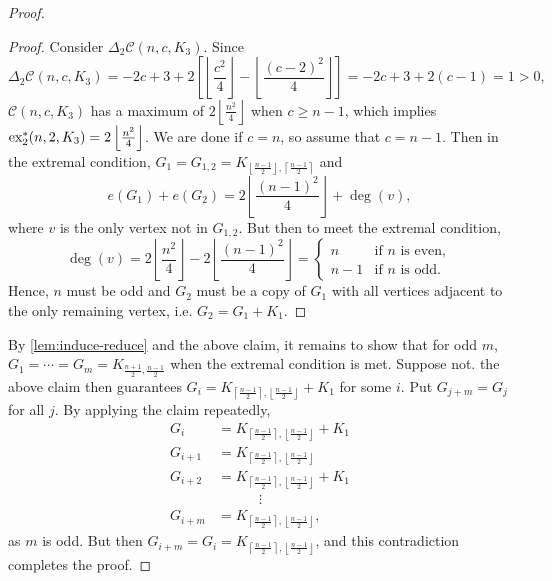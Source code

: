 \documentclass[12pt]{report}
\newcommand*{\dex}{\textnormal{ex}_2}
\newcommand*{\con}{\mathcal{C}}
\begin{document}
\begin{proof}
  \begin{proof}
    Consider $\Delta_2 \con(n, c, K_3)$. Since
    \[
      \Delta_2 \con(n, c, K_3) = -2c + 3 + 2\left[\left\lfloor\frac{c^2}{4}\right\rfloor - \left\lfloor\frac{(c - 2)^2}{4}\right\rfloor\right] = -2c + 3 + 2(c - 1) = 1 > 0,
    \]
    $\con(n, c, K_3)$ has a maximum of $2\left\lfloor \frac{n^2}{4} \right\rfloor$ when $c \geq n - 1$, which implies $\dex^*(n, 2, K_3) = 2\left\lfloor\frac{n^2}{4}\right\rfloor$. We are done if $c = n$, so assume that $c = n - 1$. Then in the extremal condition, $G_1 = G_{1, 2} = K_{\left\lfloor\frac{n - 1}{2}\right\rfloor, \left\lceil\frac{n - 1}{2}\right\rceil}$ and
    \[
      e(G_1) + e(G_2) = 2\left\lfloor\frac{(n - 1)^2}{4}\right\rfloor + \deg(v),
    \]
    where $v$ is the only vertex not in $G_{1, 2}$. But then to meet the extremal condition, 
    \[
      \deg(v) = 2\left\lfloor\frac{n^2}{4}\right\rfloor - 2\left\lfloor\frac{(n - 1)^2}{4}\right\rfloor = \begin{cases}
        n & \text{if $n$ is even}, \\
        n - 1 & \text{if $n$ is odd}.
      \end{cases}
    \]
    Hence, $n$ must be odd and $G_2$ must be a copy of $G_1$ with all vertices adjacent to the only remaining vertex, i.e. $G_2 = G_1 + K_1$.
  \end{proof}
  By \cref{lem:induce-reduce} and the above claim, it remains to show that for odd $m$, $G_1 = \cdots = G_m = K_{\frac{n + 1}{2}, \frac{n - 1}{2}}$ when the extremal condition is met. Suppose not. the above claim then guarantees $G_i = K_{\left\lceil\frac{n - 1}{2}\right\rceil, \left\lfloor\frac{n - 1}{2}\right\rfloor} + K_1$ for some $i$. Put $G_{j + m} = G_j$ for all $j$. By applying the claim repeatedly, 
  \begin{align*}
    G_i &= K_{\left\lceil\frac{n - 1}{2}\right\rceil, \left\lfloor\frac{n - 1}{2}\right\rfloor} + K_1 \\
    G_{i + 1} &= K_{\left\lceil\frac{n - 1}{2}\right\rceil, \left\lfloor\frac{n - 1}{2}\right\rfloor} \\
    G_{i + 2} &= K_{\left\lceil\frac{n - 1}{2}\right\rceil, \left\lfloor\frac{n - 1}{2}\right\rfloor} + K_1 \\
    &\qquad\quad \vdots \\
    G_{i + m} &= K_{\left\lceil\frac{n - 1}{2}\right\rceil, \left\lfloor\frac{n - 1}{2}\right\rfloor},
  \end{align*}
  as $m$ is odd. But then $G_{i + m} = G_i = K_{\left\lceil\frac{n - 1}{2}\right\rceil, \left\lfloor\frac{n - 1}{2}\right\rfloor}$, and this contradiction completes the proof.
\end{proof}
\end{document}
